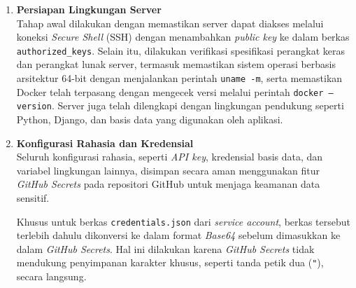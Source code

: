 \begin{enumerate}
    \item \textbf{Persiapan Lingkungan Server} \\
    Tahap awal dilakukan dengan memastikan server dapat diakses melalui koneksi \textit{Secure Shell} (SSH) dengan menambahkan \textit{public key} ke dalam berkas \texttt{authorized\_keys}. Selain itu, dilakukan verifikasi spesifikasi perangkat keras dan perangkat lunak server, termasuk memastikan sistem operasi berbasis arsitektur 64-bit dengan menjalankan perintah \texttt{uname -m}, serta memastikan Docker telah terpasang dengan mengecek versi melalui perintah \texttt{docker --version}. Server juga telah dilengkapi dengan lingkungan pendukung seperti Python, Django, dan basis data yang digunakan oleh aplikasi.

    \item \textbf{Konfigurasi Rahasia dan Kredensial} \\
    Seluruh konfigurasi rahasia, seperti \textit{API key}, kredensial basis data, dan variabel lingkungan lainnya, disimpan secara aman menggunakan fitur \textit{GitHub Secrets} pada repositori GitHub untuk menjaga keamanan data sensitif. 

    Khusus untuk berkas \texttt{credentials.json} dari \textit{service account}, berkas tersebut terlebih dahulu dikonversi ke dalam format \textit{Base64} sebelum dimasukkan ke dalam \textit{GitHub Secrets}. Hal ini dilakukan karena \textit{GitHub Secrets} tidak mendukung penyimpanan karakter khusus, seperti tanda petik dua (\texttt{"}), secara langsung. 


\end{enumerate}
